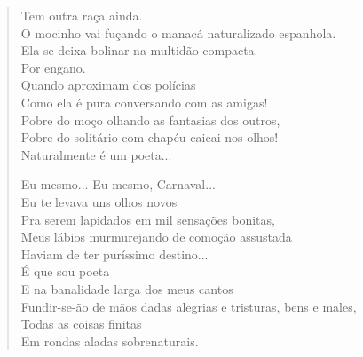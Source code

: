 \begin{verse}
Tem outra raça ainda.\\
O mocinho vai fuçando o manacá naturalizado espanhola.\\
Ela se deixa bolinar na multidão compacta.\\
\quad\quad\quad\quad\quad\quad{}Por engano.\\
Quando aproximam dos polícias\\
Como ela é pura conversando com as amigas!\\
Pobre do moço olhando as fantasias dos outros,\\
Pobre do solitário com chapéu caicai nos olhos!\\
Naturalmente é um poeta...

Eu mesmo... Eu mesmo, Carnaval...\\
Eu te levava uns olhos novos\\
Pra serem lapidados em mil sensações bonitas,\\
Meus lábios murmurejando de comoção assustada\\
Haviam de ter puríssimo destino...\\
É que sou poeta\\
E na banalidade larga dos meus cantos\\
Fundir-se-ão de mãos dadas alegrias e tristuras, bens e males,\\
Todas as coisas finitas\\
Em rondas aladas sobrenaturais.


\end{verse}
